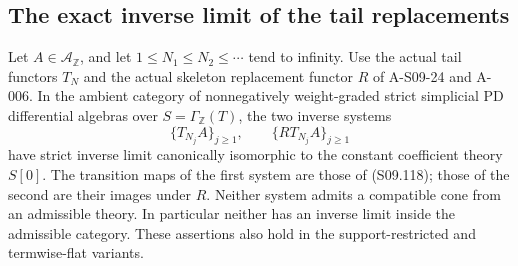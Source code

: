 \subsection{The exact inverse limit of the tail replacements}

\begin{proposition}
\label{AS0925}
Let $A\in\mathcal A_{\mathbb Z}$, and let
$1\leq N_1\leq N_2\leq\cdots$ tend to infinity.
Use the actual tail functors $T_N$ and the actual skeleton
replacement functor $R$ of A-S09-24 and A-006.
In the ambient category of nonnegatively weight-graded strict
simplicial PD differential algebras over $S=\Gamma_{\mathbb Z}(T)$,
the two inverse systems
\[
 \{T_{N_j}A\}_{j\geq1},\qquad
 \{R T_{N_j}A\}_{j\geq1}
 \tag{S09.125}
\]
have strict inverse limit canonically isomorphic to the
constant coefficient theory $S[0]$.
The transition maps of the first system are those of
(S09.118); those of the second are their images under $R$.
Neither system admits a compatible cone from an admissible
theory.  In particular neither has an inverse limit inside
the admissible category.  These assertions also hold in
the support-restricted and termwise-flat variants.
\end{proposition}

